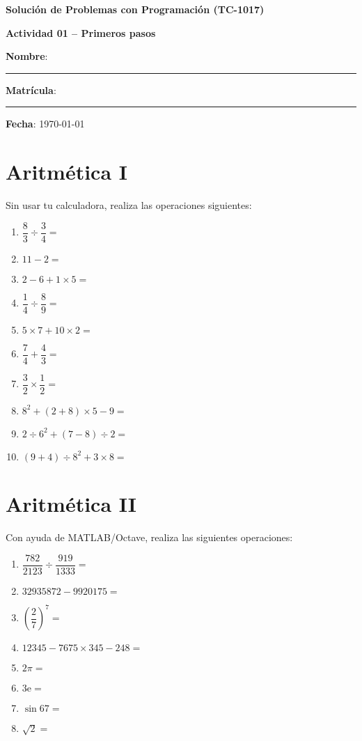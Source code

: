 \documentclass[spanish, 10pt]{article}
\begin{document}
\begin{center}
	{\Large \textbf{Solución de Problemas con Programación (TC-1017)}}
	
	\bigskip
	{\large \textbf{Actividad 01 -- Primeros pasos}}
\end{center}

\bigskip
{\large \textbf{Nombre}: \rule{14 cm}{0.4mm}}



\bigskip
{\large \textbf{Matrícula}: \rule{5 cm}{0.4mm}} \hfill {\large \textbf{Fecha}: \today}

\section{Aritmética I}

Sin usar tu calculadora, realiza las operaciones siguientes:

\begin{enumerate}[label=\alph*)]
	\item $\dfrac{8}{3} \div \dfrac{3}{4} =$
	\item $11 - 2 =$
	\item $2 - 6 + 1 \times 5 =$
	\item $\dfrac{1}{4} \div \dfrac{8}{9} =$
	\item $5 \times 7 + 10 \times 2 =$
	\item $\dfrac{7}{4} + \dfrac{4}{3} =$
	\item $\dfrac{3}{2} \times \dfrac{1}{2} =$
	\item $8^ 2 + (2+8) \times 5 - 9 =$
	\item $2 \div 6^2 + (7-8) \div 2 =$
	\item $(9 + 4) \div 8^2 + 3 \times 8 =$
\end{enumerate}

\section{Aritmética II}

Con ayuda de MATLAB/Octave, realiza las siguientes operaciones:

\begin{enumerate}[label=\alph*)]
	\item $\dfrac{782}{2123} \div \dfrac{919}{1333} =$
	\item $32935872 - 9920175 =$
	\item $\left( \dfrac{2}{7} \right)^{7} =$
	\item $12345 - 7675 \times 345 - 248 =$
	\item $2 \pi =$
	\item $3 \mathrm{e} =$
	\item $\sin 67 =$
	\item $\sqrt{2} =$
\end{enumerate}
\end{document}
